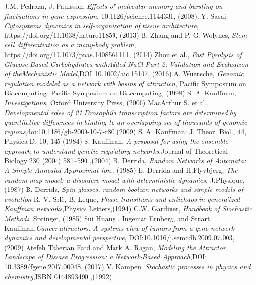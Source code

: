 \begin{thebibliography}{90}
 J.M. Pedraza, J. Paulsson, \emph{Effects of molecular memory and bursting on fluctuations in gene expression}, 10.1126/science.1144331, (2008).
 Y. Sasai \emph{Cytosystems dynamics in self-organization of tissue architecture}, https://doi.org/10.1038/nature11859, (2013)
 B. Zhang and P. G. Wolynes, \emph{Stem cell differentiation as a many-body problem}, https://doi.org/10.1073/pnas.1408561111, (2014)
 Zhou et al., \emph{Fast Pyrolysis of Glucose-Based Carbohydrates withAdded NaCl Part 2: Validation and Evaluation of theMechanistic Model},DOI 10.1002/aic.15107, (2016)
 A. Wuensche, \emph{Genomic regulation modeled as a network with basins of attraction}, Pacific Symposium on Biocomputing. Pacific Symposium on Biocomputing, (1998)
 S. A. Kauffman, \emph{Investigations}, Oxford University
Press, (2000)
 MacArthur S. et al., \emph{Developmental roles of 21 Drosophila transcription factors are determined by quantitative differences in binding to an overlapping set of thousands of genomic regions},doi:10.1186/gb-2009-10-7-r80 (2009)
 S. A. Kauffman: J. Theor. Biol., 44, Physica D, 10, 145 (1984)
 S. Kauffman, \emph{A proposal for using the ensemble approach to understand
genetic regulatory networks},Journal of Theoretical Biology 230 (2004) 581–590 ,(2004)
 B. Derrida, \emph{Random Networks of Automata: A Simple Annealed
Approximat ion.}, (1985)
 B. Derrida and H.Flyvbjerg, \emph{The random map model: a disordere model with deterministic dynamics}, J.Physique, (1987)
 B. Derrida, \emph{Spin glasses, random boolean networks and simple models of evolution}
 R. V. Solè, B. Loque, \emph{Phase transitions and antichaos in generalized Kauffman networks},Physics Letters,(1994)
 C.W. Gardiner, \emph{Handbook of Stochastic Methods}, Springer, (1985)
 Sui Huang , Ingemar Ernberg, and Stuart Kauffman,\emph{Cancer attractors: A systems view of tumors from a gene network
dynamics and developmental perspective}, DOI:10.1016/j.semcdb.2009.07.003, (2009)
 Atefeh Taherian Fard and Mark A. Ragan, \emph{Modeling the Attractor Landscape of
Disease Progression: a
Network-Based Approach},DOI: 10.3389/fgene.2017.00048, (2017)
 V. Kampen, \emph{Stochastic processes in phycics and chemistry},ISBN 0444893490 ,(1992)













\end{thebibliography}
